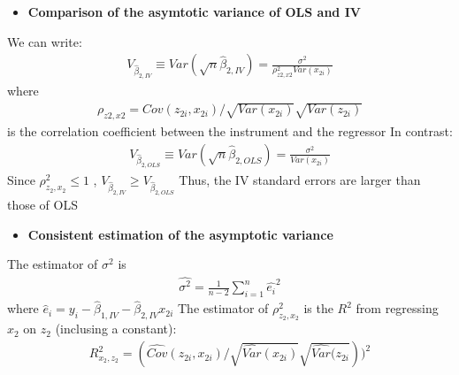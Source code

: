 \documentclass[a4paper,twoside,11pt]{article}
\begin{document}
\begin{shaded*}
\begin{itemize}
    \item \textbf{Comparison of the asymtotic variance of OLS and IV}
\end{itemize}
We can write:
\begin{equation*}
\begin{aligned}
V_{\hat{\beta}_{2,IV}} \equiv Var(\sqrt{n} \hat{\beta}_{2,IV}) = \frac{\sigma^2}{\rho^2_{z2,x2}Var(x_{2i})}
\end{aligned} 
\end{equation*}
where
\begin{equation*}
\begin{aligned}
\rho_{z2,x2} = Cov(z_{2i}, x_{2i}) / \sqrt{Var(x_{2i})} \sqrt{Var(z_{2i})}
\end{aligned} 
\end{equation*}
is the correlation coefficient between the instrument and the regressor
\newline
\newline
In contrast:
\begin{equation*}
\begin{aligned}
V_{\hat{\beta}_{2,OLS}} \equiv Var(\sqrt{n} \hat{\beta}_{2,OLS}) = \frac{\sigma^2}{Var(x_{2i})}
\end{aligned} 
\end{equation*}
Since $\rho^2_{z_2,x_2} \le 1$ , $V_{\hat{\beta}_{2,IV}} \ge V_{\hat{\beta}_{2,OLS}}$
\newline
\newline
Thus, the IV standard errors are larger than those of OLS
\begin{itemize}
    \item \textbf{Consistent estimation of the asymptotic variance}
\end{itemize}
The estimator of $\sigma^2$ is
\begin{equation*}
\begin{aligned}
\hat{\sigma^2} = \frac{1}{n-2} \sum^n_{i=1} \hat{e_i}^2 
\end{aligned} 
\end{equation*}
where $\hat{e}_i = y_i - \hat{\beta}_{1,IV} - \hat{\beta}_{2,IV} x_{2i}$
\newline
\newline
The estimator of $\rho^2_{z_2,x_2}$ is the $R^2$ from regressing $x_2$ on $z_2$ (inclusing a constant):
\begin{equation*}
\begin{aligned}
R^2_{x_2,z_2} = ( \widehat{Cov} (z_{2i}, x_{2i}) / \sqrt{\widehat{Var}(x_{2i})} \sqrt{\widehat{Var}(z_{2i}}))^2

\end{aligned}
\end{equation*}
\end{shaded*}
\end{document}

